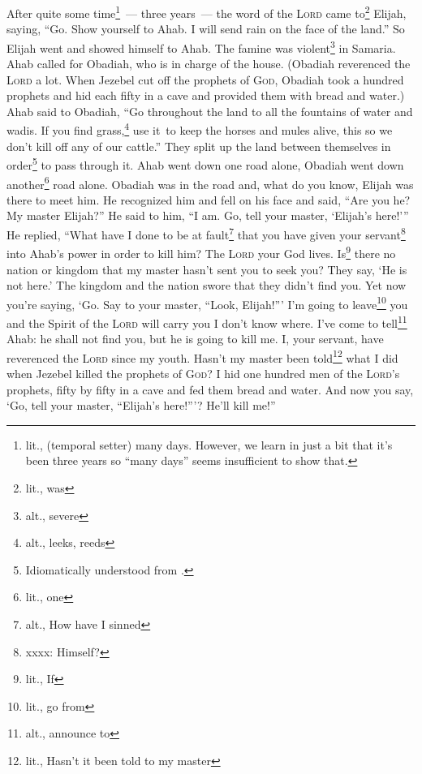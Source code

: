 
\begin{inparaenum}
     After quite some time\footnote{lit., (temporal setter) many days. However, we learn in just a bit that it's been three years so ``many days'' seems insufficient to show that.}~--- three years~--- the word of the \textsc{Lord} came to\footnote{lit., was} Elijah, saying, ``Go. Show yourself to Ahab. I will send rain on the face of the land.''%
     So Elijah went and showed himself to Ahab. The famine was violent\footnote{alt., severe} in Samaria.%
     Ahab called for Obadiah, who is in charge of the house. (Obadiah reverenced the \textsc{Lord} a lot.%
     When Jezebel cut off the prophets of \textsc{God}, Obadiah took a hundred prophets and hid each fifty in a cave and provided them with bread and water.)%
     Ahab said to Obadiah, ``Go throughout the land to all the fountains of water and wadis. If you find grass,\footnote{alt., leeks, reeds} use it\understood\ to keep the horses and mules alive, this so we don't kill off any of our cattle.''%
     They split up the land between themselves in order\footnote{Idiomatically understood from .} to pass through it. Ahab went down one road alone, Obadiah went down another\footnote{lit., one} road alone.%
     Obadiah was in the road and, what do you know, Elijah was there to meet him. He recognized him and fell on his face and said, ``Are you he? My master Elijah?''%
     He said to him, ``I am. Go, tell your master, `Elijah's here!'\thinspace''%
     He replied, ``What have I done to be at fault\footnote{alt., How have I sinned} that you have given your servant\footnote{xxxx: Himself?} into Ahab's power in order to kill him?%
     The \textsc{Lord} your God lives. Is\footnote{lit., If} there no nation or kingdom that my master hasn't sent you to seek you? They say, `He is not here.' The kingdom and the nation swore that they didn't find you.%
     Yet now you're saying, `Go. Say to your master, ``Look, Elijah!''\thinspace'%
     I'm going to leave\footnote{lit., go from} you and the Spirit of the \textsc{Lord} will carry you I don't know where. I've come to tell\footnote{alt., announce to} Ahab: he shall not find you, but he is going to kill me. I, your servant, have reverenced the \textsc{Lord} since my youth.%
     Hasn't my master been told\footnote{lit., Hasn't it been told to my master} what I did when Jezebel killed the prophets of \textsc{God}? I hid one hundred men of the \textsc{Lord}'s prophets, fifty by fifty in a cave and fed them bread and water.%
     And now you say, `Go, tell your master, ``Elijah's here!''\thinspace'? He'll kill me!''%
    

\end{inparaenum}
